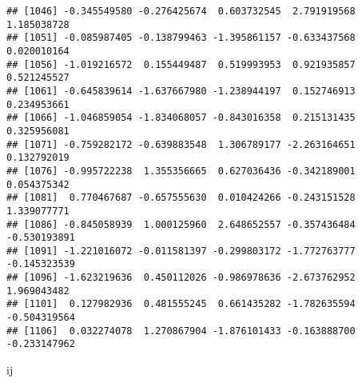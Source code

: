 \documentclass[
]{article}
\newenvironment{Shaded}{\begin{snugshade}}{\end{snugshade}}
\newcommand{\NormalTok}[1]{#1}
\begin{document}
\begin{verbatim}
## [1046] -0.345549580 -0.276425674  0.603732545  2.791919568  1.185038728
## [1051] -0.085987405 -0.138799463 -1.395861157 -0.633437568  0.020010164
## [1056] -1.019216572  0.155449487  0.519993953  0.921935857  0.521245527
## [1061] -0.645839614 -1.637667980 -1.238944197  0.152746913  0.234953661
## [1066] -1.046859054 -1.834068057 -0.843016358  0.215131435  0.325956081
## [1071] -0.759282172 -0.639883548  1.306789177 -2.263164651  0.132792019
## [1076] -0.995722238  1.355356665  0.627036436 -0.342189001  0.054375342
## [1081]  0.770467687 -0.657555630  0.010424266 -0.243151528  1.339077771
## [1086] -0.845058939  1.000125960  2.648652557 -0.357436484 -0.530193891
## [1091] -1.221016072 -0.011581397 -0.299803172 -1.772763777 -0.145323539
## [1096] -1.623219636  0.450112026 -0.986978636 -2.673762952  1.969043482
## [1101]  0.127982936  0.481555245  0.661435282 -1.782635594 -0.504319564
## [1106]  0.032274078  1.270867904 -1.876101433 -0.163888700 -0.233147962
\end{verbatim}

\begin{Shaded}
\begin{Highlighting}[]
\NormalTok{ij}
\end{Highlighting}
\end{Shaded}
\end{document}
